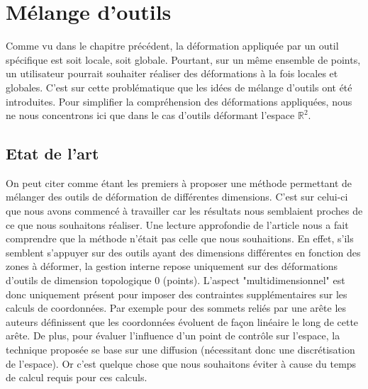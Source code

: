 

\chapter{Mélange d'outils}

\graphicspath{ {Chapter2/Chapter2Figs/PNG/}
  {Chapter2/Chapter2Figs/PDF/} {Chapter2/Chapter2Figs/} }

Comme vu dans le chapitre précédent, la déformation appliquée par un
outil spécifique est soit locale, soit globale. Pourtant, sur un même
ensemble de points, un utilisateur pourrait souhaiter réaliser des
déformations à la fois locales et globales. C'est sur cette
problématique que les idées de mélange d'outils ont été
introduites. Pour simplifier la compréhension des déformations
appliquées, nous ne nous concentrons ici que dans le cas d'outils
déformant l'espace $\mathbb{R}^2$.

\section{Etat de l'art}

On peut citer \cite{JBPS11} comme étant les premiers à proposer une
méthode permettant de mélanger des outils de déformation de
différentes dimensions. C'est sur celui-ci que nous avons commencé à
travailler car les résultats nous semblaient proches de ce que nous
souhaitons réaliser. Une lecture approfondie de l'article nous a fait
comprendre que la méthode n'était pas celle que nous souhaitions. En
effet, s'ils semblent s'appuyer sur des outils ayant des dimensions
différentes en fonction des zones à déformer, la gestion interne
repose uniquement sur des déformations d'outils de dimension
topologique 0 (points). L'aspect "multidimensionnel" est donc
uniquement présent pour imposer des contraintes supplémentaires sur
les calculs de coordonnées. Par exemple pour des sommets reliés par
une arête les auteurs définissent que les coordonnées évoluent de
façon linéaire le long de cette arête. De plus, pour évaluer
l'influence d'un point de contrôle sur l'espace, la technique proposée
se base sur une diffusion (nécessitant donc une discrétisation de
l'espace). Or c'est quelque chose que nous souhaitons éviter à cause
du temps de calcul requis pour ces calculs.
\\

